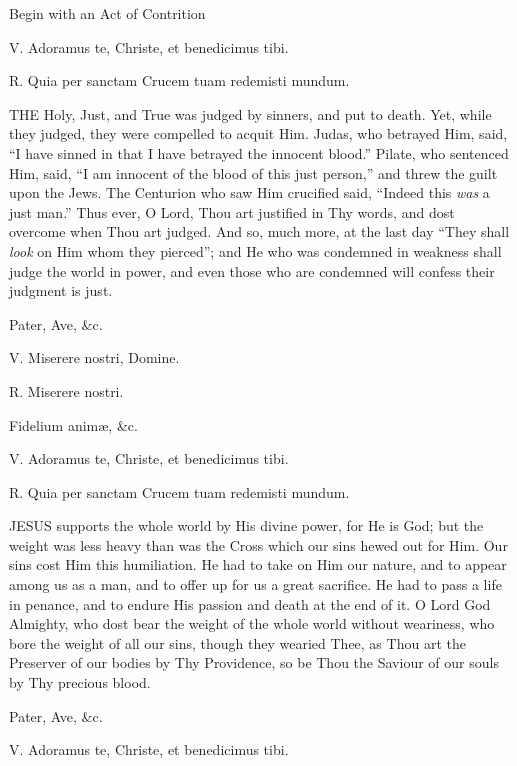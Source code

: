 Begin
with an Act of Contrition


V. Adoramus te, Christe, et
benedicimus tibi.

R. Quia per sanctam Crucem tuam redemisti mundum.

THE Holy, Just, and
True was judged by sinners, and put to death. Yet, while they judged,
they were compelled to acquit Him. Judas, who betrayed Him, said, ``I
have sinned in that I have betrayed the innocent blood.'' Pilate, who
sentenced Him, said, ``I am innocent of the blood of this just person,''
and threw the guilt upon the Jews. The Centurion who saw Him crucified
said, ``Indeed this \emph{was} a just man.'' Thus ever, O Lord, Thou art
justified in Thy words, and dost overcome when Thou art judged. And so,
much more, at the last day ``They shall \emph{look} on Him whom they
pierced''; and He who was condemned in weakness shall judge the world in
power, and even those who are condemned will confess their judgment is
just.

Pater, Ave, \&c.

V. Miserere nostri, Domine.

R. Miserere nostri.

Fidelium animæ, \&c.


V. Adoramus te, Christe, et
benedicimus tibi.

R. Quia per sanctam Crucem tuam redemisti mundum.

JESUS supports the
whole world by His divine power, for He is God; but the weight was less
heavy than was the Cross which our sins hewed out for Him. Our sins cost
Him this humiliation. He had to take on Him our nature, and to appear
among us as a man, and to offer up for us a great sacrifice. He had to
pass a life in penance, and to endure His passion and death at the end
of it. O Lord God Almighty, who dost bear the weight of the whole world
without weariness, who bore the weight of all our sins, though they
wearied Thee, as Thou art the Preserver of our bodies by Thy Providence,
so be Thou the Saviour of our souls by Thy precious blood.

Pater, Ave, \&c.


V. Adoramus te, Christe, et
benedicimus tibi.

